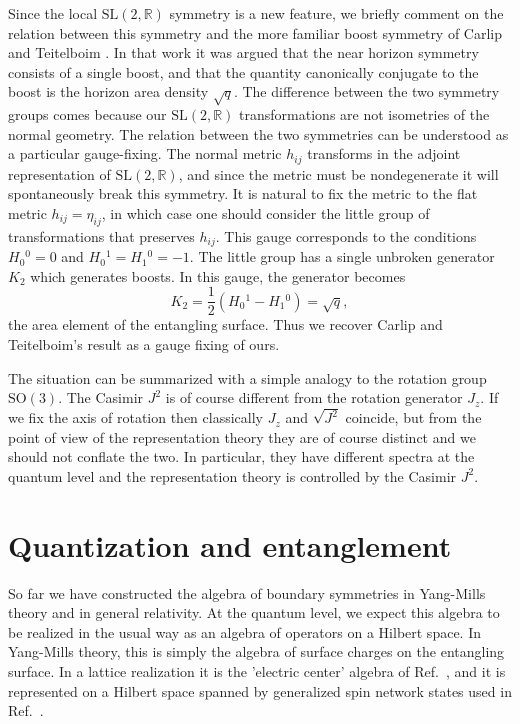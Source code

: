 \documentclass[a4paper,11pt]{article}
\newcommand{\SO}{\text{SO}}
\newcommand{\slr}{\text{SL}(2,\mathbb{R})}
\begin{document}
Since the local $\slr$ symmetry is a new feature, we briefly comment on the relation between this symmetry and the more familiar boost symmetry of Carlip and Teitelboim \cite{Carlip1993}.
In that work it was argued that the near horizon symmetry consists of a single boost, and that the quantity canonically conjugate to the boost is the horizon area density $\sqrt{q}$.
The difference between the two symmetry groups comes because our $\slr$ transformations are not isometries of the normal geometry.
The relation between the two symmetries can be understood as a particular gauge-fixing.
The normal metric $h_{ij}$ transforms in the adjoint representation of $\slr$, and since the metric must be nondegenerate it will spontaneously break this symmetry.
It is natural to fix the metric to the flat metric $h_{ij} = \eta_{ij}$, in which case one should consider the little group of transformations that preserves $h_{ij}$. 
This gauge corresponds to the conditions $H_0{}^0=0$ and $H_0{}^1= H_1{}^0=-1$.
The little group has a single unbroken generator $K_2$ which generates boosts.
In this gauge, the generator becomes
\begin{equation}
K_2 = \frac12 (H_{0}{}^1 - H_{1}{}^0) = \sqrt{q},
\end{equation}
the area element of the entangling surface. 
Thus we recover Carlip and Teitelboim's result as a gauge fixing of ours.

The situation can be summarized with a simple analogy to the rotation group $\SO(3)$. 
The Casimir $J^2$ is of course different from the rotation generator $J_z$.
If we fix the axis of rotation then classically $J_z$ and $\sqrt{J^2}$ coincide, but from the point of view of the representation theory they are of course distinct and we should not conflate the two.
In particular, they have different spectra at the quantum level and the representation theory is controlled by the Casimir $J^2$.

\section{Quantization and entanglement}
\label{section:quantization}

So far we have constructed the algebra of boundary symmetries in Yang-Mills theory and in general relativity.
At the quantum level, we expect this algebra to be realized in the usual way as an algebra of operators on a Hilbert space.
In Yang-Mills theory, this is simply the algebra of surface charges on the entangling surface. 
In a lattice realization it is the 'electric center' algebra of Ref.~\cite{Casini:2013rba}, and it is represented on a Hilbert space spanned by generalized spin network states used in Ref.~\cite{Donnelly2011}.
\end{document}
